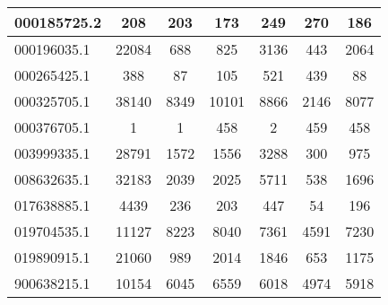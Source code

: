 \begin{tabular}{|l||c|c|c|c|c|c|}
\hline
000185725.2 & \cellcolor[RGB]{254, 250, 250} 208 & \cellcolor[RGB]{250, 250, 254} 203 & \cellcolor[RGB]{200, 200, 249} 173 & \cellcolor[RGB]{235, 71, 71} 249 & \cellcolor[RGB]{235, 71, 71} 270 & \cellcolor[RGB]{223, 223, 251} 186 \\
\hline
000196035.1 & \cellcolor[RGB]{235, 71, 71} 22084 & \cellcolor[RGB]{232, 232, 252} 688 & \cellcolor[RGB]{237, 237, 253} 825 & \cellcolor[RGB]{248, 195, 195} 3136 & \cellcolor[RGB]{223, 223, 251} 443 & \cellcolor[RGB]{252, 232, 232} 2064 \\
\hline
000265425.1 & \cellcolor[RGB]{252, 232, 232} 388 & \cellcolor[RGB]{232, 232, 252} 87 & \cellcolor[RGB]{232, 232, 252} 105 & \cellcolor[RGB]{250, 214, 214} 521 & \cellcolor[RGB]{251, 223, 223} 439 & \cellcolor[RGB]{232, 232, 252} 88 \\
\hline
000325705.1 & \cellcolor[RGB]{235, 71, 71} 38140 & \cellcolor[RGB]{241, 241, 253} 8349 & \cellcolor[RGB]{235, 71, 71} 10101 & \cellcolor[RGB]{253, 237, 237} 8866 & \cellcolor[RGB]{48, 48, 232} 2146 & \cellcolor[RGB]{227, 227, 252} 8077 \\
\hline
000376705.1 & \cellcolor[RGB]{232, 232, 252} 1 & \cellcolor[RGB]{232, 232, 252} 1 & \cellcolor[RGB]{252, 232, 232} 458 & \cellcolor[RGB]{232, 232, 252} 2 & \cellcolor[RGB]{252, 232, 232} 459 & \cellcolor[RGB]{252, 232, 232} 458 \\
\hline
003999335.1 & \cellcolor[RGB]{235, 71, 71} 28791 & \cellcolor[RGB]{255, 255, 255} 1572 & \cellcolor[RGB]{255, 255, 255} 1556 & \cellcolor[RGB]{235, 71, 71} 3288 & \cellcolor[RGB]{177, 177, 246} 300 & \cellcolor[RGB]{218, 218, 251} 975 \\
\hline
008632635.1 & \cellcolor[RGB]{235, 71, 71} 32183 & \cellcolor[RGB]{255, 255, 255} 2039 & \cellcolor[RGB]{255, 255, 255} 2025 & \cellcolor[RGB]{235, 71, 71} 5711 & \cellcolor[RGB]{48, 48, 232} 538 & \cellcolor[RGB]{218, 218, 251} 1696 \\
\hline
017638885.1 & \cellcolor[RGB]{235, 71, 71} 4439 & \cellcolor[RGB]{253, 237, 237} 236 & \cellcolor[RGB]{237, 237, 253} 203 & \cellcolor[RGB]{235, 71, 71} 447 & \cellcolor[RGB]{48, 48, 232} 54 & \cellcolor[RGB]{227, 227, 252} 196 \\
\hline
019704535.1 & \cellcolor[RGB]{235, 71, 71} 11127 & \cellcolor[RGB]{251, 223, 223} 8223 & \cellcolor[RGB]{253, 237, 237} 8040 & \cellcolor[RGB]{237, 237, 253} 7361 & \cellcolor[RGB]{48, 48, 232} 4591 & \cellcolor[RGB]{227, 227, 252} 7230 \\
\hline
019890915.1 & \cellcolor[RGB]{235, 71, 71} 21060 & \cellcolor[RGB]{227, 227, 252} 989 & \cellcolor[RGB]{252, 227, 227} 2014 & \cellcolor[RGB]{253, 237, 237} 1846 & \cellcolor[RGB]{214, 214, 250} 653 & \cellcolor[RGB]{237, 237, 253} 1175 \\
\hline
900638215.1 & \cellcolor[RGB]{235, 71, 71} 10154 & \cellcolor[RGB]{254, 250, 250} 6045 & \cellcolor[RGB]{235, 71, 71} 6559 & \cellcolor[RGB]{250, 250, 254} 6018 & \cellcolor[RGB]{48, 48, 232} 4974 & \cellcolor[RGB]{223, 223, 251} 5918 \\
\hline
\end{tabular}
